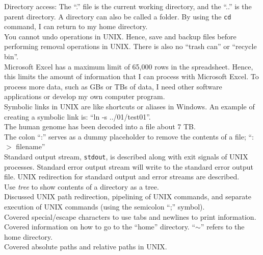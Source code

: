 Directory access: The ``.'' file is the current working directory, and the ``..'' is the parent directory. A directory can also be called a folder. By using the {\tt cd} command, I can return to my home directory. \\

You cannot undo operations in UNIX. Hence, save and backup files before performing removal operations in UNIX. There is also no ``trash can'' or ``recycle bin''. \\

Microsoft Excel has a maximum limit of 65,000 rows in the spreadsheet. Hence, this limits the amount of information that I can process with Microsoft Excel. To process more data, such as GBs or TBs of data, I need other software applications or develop my own computer program. \\ 

Symbolic links in UNIX are like shortcuts or aliases in Windows. An example of creating a symbolic link is: ``ln -s ../01/test01''. \\

The human genome has been decoded into a file about 7 TB. \\

The colon ``:'' serves as a dummy placeholder to remove the contents of a file; ``: $>$ filename'' \\

Standard output stream, {\tt stdout}, is described along with exit signals of UNIX processes. Standard error output stream will write to the standard error output file. UNIX redirection for standard output and error streams are described. \\

Use {\it tree} to show contents of a directory as a tree. \\

Discussed UNIX path redirection, pipelining of UNIX commands, and separate execution of UNIX commands (using the semicolon ``;'' symbol). \\

Covered special/escape characters to use tabs and newlines to print information. \\

Covered information on how to go to the ``home'' directory. ``$\sim$'' refers to the home directory. \\


Covered absolute paths and relative paths in UNIX. \\

